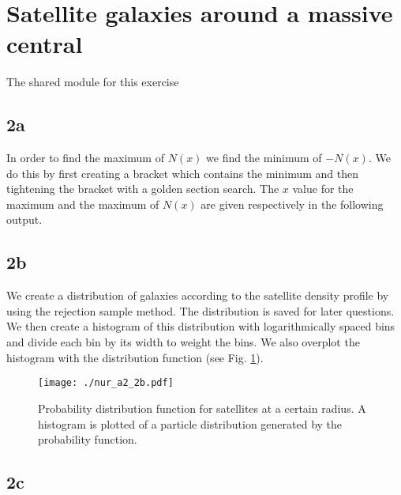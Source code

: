 \section{Satellite galaxies around a massive central}

The shared module for this exercise 



\subsection{2a}



In order to find the maximum of $N(x)$ we find the minimum of $-N(x)$. We do this by first creating a bracket which contains the minimum and then tightening the bracket with a golden section search. The $x$ value for the maximum and the maximum of $N(x)$ are given respectively in the following output.



\subsection{2b}



We create a distribution of galaxies according to the satellite density profile by using the rejection sample method. The distribution is saved for later questions. We then create a histogram of this distribution with logarithmically spaced bins and divide each bin by its width to weight the bins. We also overplot the histogram with the distribution function (see Fig. \ref{fig:2b}).

\newpage

\begin{figure}[!ht]
  \centering
  \texttt{[image: ./nur\_a2\_2b.pdf]}
  \caption{Probability distribution function for satellites at a certain radius. A histogram is plotted of a particle distribution generated by the probability function.}
  \label{fig:2b}
\end{figure}

\newpage

\subsection{2c}



